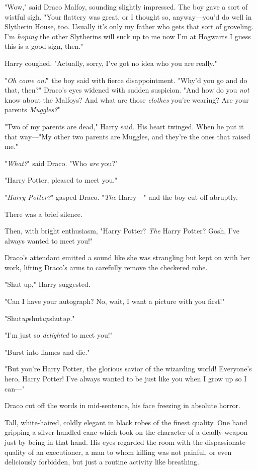 "Wow," said Draco Malfoy, sounding slightly impressed. The boy gave a sort of
wistful sigh. "Your flattery was great, or I thought so, anyway—you'd do well
in Slytherin House, too. Usually it's only my father who gets that sort of
groveling. I'm \emph{hoping} the other Slytherins will suck up to me now I'm
at Hogwarts{\el} I guess this is a good sign, then."

Harry coughed. "Actually, sorry, I've got no idea who you are really."

"\emph{Oh come on!}" the boy said with fierce disappointment. "Why'd you go and
do that, then?" Draco's eyes widened with sudden suspicion. "And how do you
\emph{not} know about the Malfoys? And what are those \emph{clothes} you're
wearing? Are your parents \emph{Muggles?}"

"Two of my parents are dead," Harry said. His heart twinged. When he put it
that way—"My other two parents are Muggles, and they're the ones that raised
me."

"\emph{What?}" said Draco. "Who \emph{are} you?"

"Harry Potter, pleased to meet you."

"\emph{Harry Potter?}" gasped Draco. "\emph{The} Harry—" and the boy cut off
abruptly.

There was a brief silence.

Then, with bright enthusiasm, "Harry Potter? \emph{The} Harry Potter? Gosh,
I've always wanted to meet you!"

Draco's attendant emitted a sound like she was strangling but kept on with her
work, lifting Draco's arms to carefully remove the checkered robe.

"Shut up," Harry suggested.

"Can I have your autograph? No, wait, I want a picture with you first!"

"Shut\emph{up}shut\emph{up}shut\emph{up.}"

"I'm just so \emph{delighted} to meet you!"

"Burst into flames and die."

"But you're Harry Potter, the glorious savior of the wizarding world!
Everyone's hero, Harry Potter! I've always wanted to be just like you when I
grow up so I can—"

Draco cut off the words in mid-sentence, his face freezing in absolute horror.

Tall, white-haired, coldly elegant in black robes of the finest quality. One
hand gripping a silver-handled cane which took on the character of a deadly
weapon just by being in that hand. His eyes regarded the room with the
dispassionate quality of an executioner, a man to whom killing was not painful,
or even deliciously forbidden, but just a routine activity like breathing.

